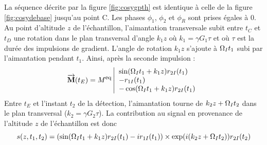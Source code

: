 La séquence décrite par la figure \ref{fig:cosygpth} est identique à celle
de la figure \ref{fig:cosydebase} jusqu'au point C.
Les phases $\phi_1$, $\phi_2$ et $\phi_R$ sont prises égales à 0.
Au point d'altitude $z$ de l'échantillon, l'aimantation
transversale subit entre $t_C$ et $t_D$ une rotation dans le plan transversal d'angle $k_1 z$
où $k_1 = \gamma G_1 \tau$ et où $\tau$ est la durée des impulsions de gradient.
L'angle de rotation $k_1 z$ s'ajoute à $\Omega_I t_1$ subi par l'aimantation pendant $t_1$.
Ainsi, après la seconde impulsion :
\begin{equation}
\overrightarrow{\mathbf{M}}(t_E) =  M^{\mbox{\footnotesize{eq}}}
\left|\begin{array}{l}\sin(\Omega_I t_1 + k_1 z) r_{2I}(t_1)\\-r_{1I}(t_1)\\-\cos(\Omega_I t_1 + k_1 z) r_{2I}(t_1)\end{array}\right.
\end{equation}
Entre $t_E$ et l'instant $t_2$ de la détection, l'aimantation tourne
de $k_2 z + \Omega_I t_2$ dans le plan transversal ($k_2 = \gamma G_2 \tau$).
La contribution au signal en provenance de l'altitude $z$ de l'échantillon est donc
\begin{equation}
s(z, t_1, t_2) = (\sin(\Omega_I t_1 + k_1 z) r_{2I}(t_1) -ir_{1I}(t_1))
\times \exp(i(k_2 z + \Omega_I t_2)) r_{2I}(t_2)
\end{equation}

